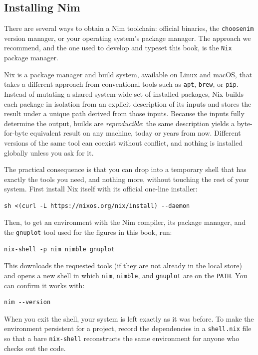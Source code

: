 \documentclass[justified, sixbynine]{tufte-book}
\def\ft{\small\tt}
\theoremstyle{plain}%
\newtheorem * {corollary}{Corollary}
\theoremstyle{definition}
\theoremstyle{remark}
\newtheorem * {remark}{Remark}
\newtheorem * {note}{Note}
\begin{document}
\begin{fullwidth}
\goodbreak\section{Installing Nim}

There are several ways to obtain a Nim toolchain: official binaries, the {\ft choosenim} version manager, or your operating system's package manager. The approach we recommend, and the one used to develop and typeset this book, is the {\ft Nix} package manager.

Nix is a package manager and build system, available on Linux and macOS, that takes a different approach from conventional tools such as {\ft apt}, {\ft brew}, or {\ft pip}. Instead of mutating a shared system-wide set of installed packages, Nix builds each package in isolation from an explicit description of its inputs and stores the result under a unique path derived from those inputs. Because the inputs fully determine the output, builds are \emph{reproducible}: the same description yields a byte-for-byte equivalent result on any machine, today or years from now. Different versions of the same tool can coexist without conflict, and nothing is installed globally unless you ask for it.

The practical consequence is that you can drop into a temporary shell that has exactly the tools you need, and nothing more, without touching the rest of your system. First install Nix itself with its official one-line installer:
\begin{lstlisting}
sh <(curl -L https://nixos.org/nix/install) --daemon
\end{lstlisting}

Then, to get an environment with the Nim compiler, its package manager, and the {\ft gnuplot} tool used for the figures in this book, run:
\begin{lstlisting}
nix-shell -p nim nimble gnuplot
\end{lstlisting}

This downloads the requested tools (if they are not already in the local store) and opens a new shell in which {\ft nim}, {\ft nimble}, and {\ft gnuplot} are on the {\ft PATH}. You can confirm it works with:
\begin{lstlisting}
nim --version
\end{lstlisting}

When you exit the shell, your system is left exactly as it was before. To make the environment persistent for a project, record the dependencies in a {\ft shell.nix} file so that a bare {\ft nix-shell} reconstructs the same environment for anyone who checks out the code.


\end{fullwidth}
\end{document}
